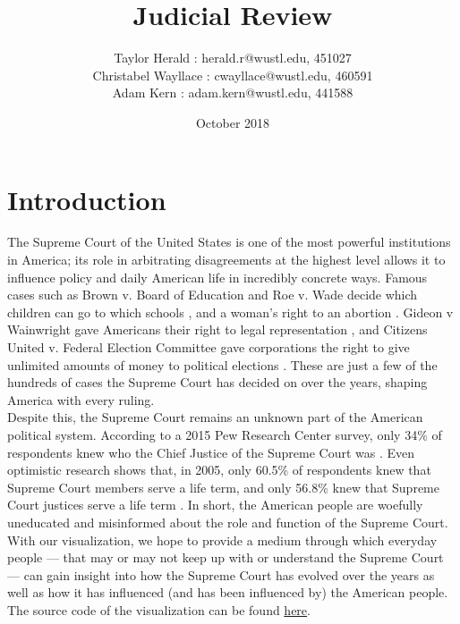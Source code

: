 \documentclass{article}
\title{Judicial Review}
\author{ Taylor Herald : herald.r@wustl.edu, 451027\\
            Christabel Wayllace : cwayllace@wustl.edu, 460591\\
            Adam Kern : adam.kern@wustl.edu, 441588
}
\date{October 2018}
\begin{document}
\maketitle

\section{Introduction}
The Supreme Court of the United States is one of the most powerful institutions in America; its role in arbitrating disagreements at the highest level allows it to influence policy and daily American life in incredibly concrete ways.  Famous cases such as Brown v. Board of Education and Roe v. Wade decide which children can go to which schools \cite{oyez-brown}, and a woman's right to an abortion \cite{oyez-roe}.  Gideon v Wainwright gave Americans their right to legal representation \cite{oyez-gideon}, and Citizens United v. Federal Election Committee gave corporations the right to give unlimited amounts of money to political elections \cite{oyez-fec}.  These are just a few of the hundreds of cases the Supreme Court has decided on over the years, shaping America with every ruling.\\

Despite this, the Supreme Court remains an unknown part of the American political system.  According to a 2015 Pew Research Center survey, only 34\% of respondents knew who the Chief Justice of the Supreme Court was \cite{pew-scotus-awareness}.  Even optimistic research shows that, in 2005, only 60.5\% of respondents knew that Supreme Court members serve a life term, and only 56.8\% knew that Supreme Court justices serve a life term \cite{gibson-survey}.  In short, the American people are woefully uneducated and misinformed about the role and function of the Supreme Court.\\

With our visualization, we hope to provide a medium through which everyday people --- that may or may not keep up with or understand the Supreme Court --- can gain insight into how the Supreme Court has evolved over the years as well as how it has influenced (and has been influenced by) the American people. The source code of the visualization can be found \href{https://github.com/therald/Judicial-Review.git}{here}.\\
\end{document}
